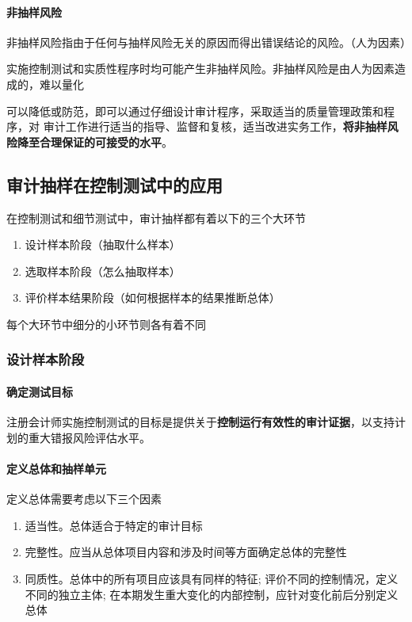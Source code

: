 \documentclass[UTF8,12pt]{ctexart}
\numberwithin{equation}{section} %
\numberwithin{figure}{section}
\numberwithin{table}{section}
\begin{document}
	\paragraph{非抽样风险}
	非抽样风险指由于任何与抽样风险无关的原因而得出错误结论的风险。（人为因素）
	
	实施控制测试和实质性程序时均可能产生非抽样风险。非抽样风险是由人为因素造成的，难以量化
	
	可以降低或防范，即可以通过仔细设计审计程序，采取适当的质量管理政策和程序，对 审计工作进行适当的指导、监督和复核，适当改进实务工作，\textbf{将非抽样风险降至合理保证的可接受的水平}。
	
	\subsection{审计抽样在控制测试中的应用}
	在控制测试和细节测试中，审计抽样都有着以下的三个大环节
	\begin{enumerate}
		\item 设计样本阶段（抽取什么样本）
		
		\item 选取样本阶段（怎么抽取样本）
		
		\item 评价样本结果阶段（如何根据样本的结果推断总体）
	\end{enumerate}
	每个大环节中细分的小环节则各有着不同
	
	\subsubsection{设计样本阶段}
	\paragraph{确定测试目标} 注册会计师实施控制测试的目标是提供关于\textbf{控制运行有效性的审计证据}，以支持计划的重大错报风险评估水平。
	
	\paragraph{定义总体和抽样单元}
	定义总体需要考虑以下三个因素
	\begin{enumerate}
		\item 适当性。总体适合于特定的审计目标
		
		\item 完整性。应当从总体项目内容和涉及时间等方面确定总体的完整性
		
		\item 同质性。总体中的所有项目应该具有同样的特征; 评价不同的控制情况，定义不同的独立主体; 在本期发生重大变化的内部控制，应针对变化前后分别定义总体
	\end{enumerate}
	
\end{document}
